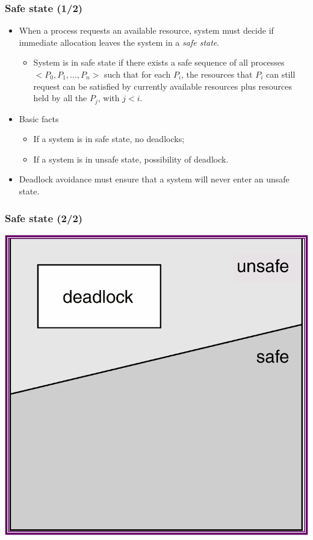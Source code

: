 \documentclass[CJKutf8,xcolor=pdftex,dvipsnames,table]{beamer}
\begin{document}
\begin{CJK*}{UTF8}{song}
  \begin{frame}
  \frametitle{Safe state (1/2)} \pause
  \begin{itemize}
  \item{When a process requests an available resource, system must decide if immediate allocation leaves the system in a \emph{safe state}.} \pause
    \begin{itemize}
    \item{System is in safe state if there exists a safe sequence of all processes $<P_0, P_1, ..., P_n>$ such that for each $P_i$, the resources that $P_i$ can still request can be satisfied by currently available resources plus resources held by all the $P_j$, with $j<i$.} \pause
    \end{itemize}
  \item{Basic facts} \pause
    \begin{itemize}
    \item{If a system is in safe state, no deadlocks;} \pause
    \item{If a system is in unsafe state,  possibility of deadlock.} \pause
    \end{itemize}
  \item{Deadlock avoidance must ensure that a system will never enter an unsafe state.}
  \end{itemize}
  \end{frame}

  \begin{frame}
  \frametitle{Safe state (2/2)} \pause
  \begin{center}
    \includegraphics[scale=0.5]{v6f8-4}
  \end{center}
  \end{frame}


\end{CJK*}
\end{document}
